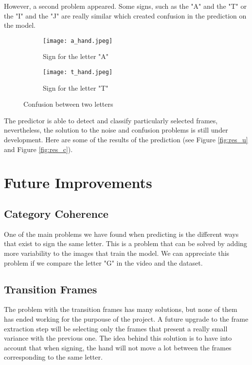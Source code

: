 \documentclass[9pt,a4paper,twoside]{tau-class/tau}
\begin{document}
    However, a second problem appeared. Some signs, such as the "A" and the "T" or the "I" and the "J" are really similar which created confusion in the prediction on the model.\\
    \begin{figure}[H]
        \centering
        \begin{subfigure}[b]{0.43\linewidth}
            \texttt{[image: a\_hand.jpeg]}
            \caption{Sign for the letter "A"}
            \label{fig:photo_a}
        \end{subfigure}
        \hspace{10pt}
        \begin{subfigure}[b]{0.43\linewidth}
            \texttt{[image: t\_hand.jpeg]}
            \caption{Sign for the letter "T"}
            \label{fig:photo_t}
        \end{subfigure}
        \caption{Confusion between two letters}
    \end{figure}

    The predictor is able to detect and classify particularly selected frames, nevertheless, the solution to the noise and confusion problems is still under development.
    Here are some of the results of the prediction (see Figure \ref{fig:res_u} and Figure \ref{fig:res_c}).  
	
    \section{Future Improvements}
        \subsection{Category Coherence}
            One of the main problems we have found when predicting is the different ways that exist to sign the same letter. This is a problem that can be solved by adding more variability to the images that train the model. We can appreciate this problem if we compare the letter "G" in the video and the dataset.
        \subsection{Transition Frames}
            The problem with the transition frames has many solutions, but none of them has ended working for the purpouse of the project. A future upgrade to the frame extraction step will be selecting only the frames that present a really small variance with the previous one.
            The idea behind this solution is to have into account that when signing, the hand will not move a lot between the frames corresponding to the same letter.
\end{document}
